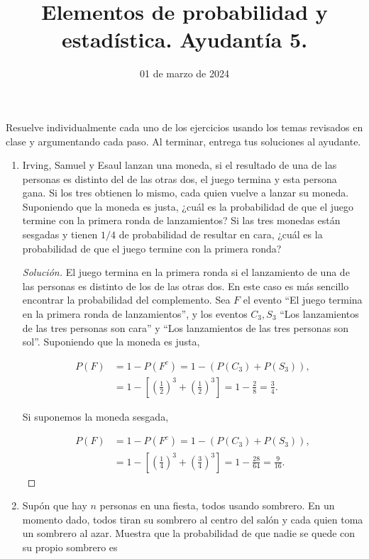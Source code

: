 \documentclass{article}
\title{Elementos de probabilidad y estadística. Ayudantía 5.}
\date{01 de marzo de 2024}
\renewcommand{\P}[1]{P\left(#1\right)}
\begin{document}
\maketitle

Resuelve individualmente cada uno de los ejercicios usando los temas revisados en clase y argumentando cada paso. Al terminar, entrega tus soluciones al ayudante.


\begin{enumerate}

    \item Irving, Samuel y Esaul lanzan una moneda, si el resultado de una de las personas es distinto del de las otras dos, el juego termina y esta persona gana. Si los tres obtienen lo mismo, cada quien vuelve a lanzar su moneda. Suponiendo que la moneda es justa, ¿cuál es la probabilidad de que el juego termine con la primera ronda de lanzamientos? Si las tres monedas están sesgadas y tienen $1/4$ de probabilidad de resultar en cara, ¿cuál es la probabilidad de que el juego termine con la primera ronda?
    
    \begin{proof}[Solución]
        El juego termina en la primera ronda si el lanzamiento de una de las personas es distinto de los de las otras dos. En este caso es más sencillo encontrar la probabilidad del complemento. Sea $F$ el evento ``El juego termina en la primera ronda de lanzamientos'', y los eventos $C_3, S_3$ ``Los lanzamientos de las tres personas son cara'' y ``Los lanzamientos de las tres personas son sol''. Suponiendo que la moneda es justa,

        \begin{align*}
            \P{ F } &= 1 - \P{F^c} = 1 - \left( \P{C_3} + \P{S_3}  \right),\\
            &= 1 - \left[ \left(\frac12\right)^3 + \left(\frac12\right)^3 \right] = 1 - \frac28  = \frac34.
        \end{align*}

        Si suponemos la moneda sesgada,

        \begin{align*}
            \P{ F } &= 1 - \P{F^c} = 1 - \left( \P{C_3} + \P{S_3}  \right),\\
            &= 1 - \left[ \left(\frac14\right)^3 + \left(\frac34\right)^3 \right] = 1 - \frac{28}{64} = \frac{9}{16}.
        \end{align*}
    \end{proof}
    
    \item Supón que hay $n$ personas en una fiesta, todos usando sombrero. En un momento dado, todos tiran su sombrero al centro del salón y cada quien toma un sombrero al azar. Muestra que la probabilidad de que nadie se quede con su propio sombrero es
    

\end{enumerate}
\end{document}
